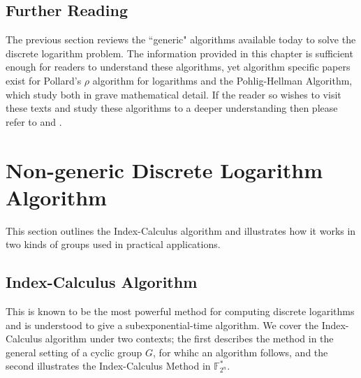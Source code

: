 \documentclass[iwp,first]{luthesis}
\begin{document}
\subsection{Further Reading}

The previous section reviews the ``generic" algorithms available today to solve the discrete logarithm problem. The information provided in this chapter is sufficient enough for readers to understand these algorithms, yet algorithm specific papers exist for Pollard's $\rho$ algorithm for logarithms and the Pohlig-Hellman Algorithm, which study both in grave mathematical detail. If the reader so wishes to visit these texts and study these algorithms to a deeper understanding then please refer to \cite{PRho} and \cite{PH}.



\section{Non-generic Discrete Logarithm Algorithm}

This section outlines the Index-Calculus algorithm and illustrates how it works in two kinds of groups used in practical applications.



\subsection{Index-Calculus Algorithm}

This is known to be the most powerful method for computing discrete logarithms and is understood to give a subexponential-time algorithm. We cover the Index-Calculus algorithm under two contexts; the first describes the method in the general setting of a cyclic group $G$, for whihc an algorithm follows, and the second illustrates the Index-Calculus Method in $\mathbb{F}_{2^n}^{*}$.
\end{document}

